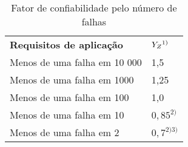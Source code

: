 \begin{table}
\centering
\caption{\label{tab:2} Fator de confiabilidade pelo número de falhas}
\begin{tabular}{ll}
\textbf{Requisitos de aplicação}      & \textbf{$Y_Z \\ ^{1)}$}   \\
Menos de uma falha em 10 000 & 1,5       \\
Menos de uma falha em 1000   & 1,25      \\
Menos de uma falha em 100    & 1,0       \\
Menos de uma falha em 10     & $0,85 ^{2)}$   \\
Menos de uma falha em 2      & $0,7^{2) 3)}$
\end{tabular}
\end{table}